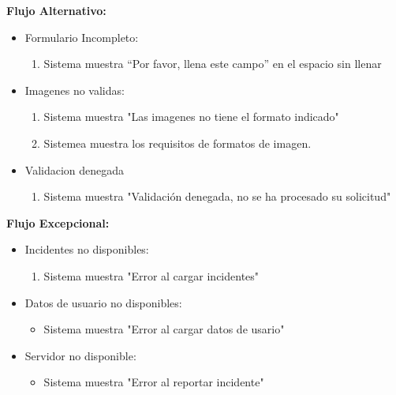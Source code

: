 \begin{multicols}{2}
\textbf{Flujo Alternativo:}
\begin{itemize}
    \item Formulario Incompleto:
    \begin{enumerate}
        \item Sistema muestra “Por favor, llena este campo” en el espacio sin llenar
    \end{enumerate}
    \item Imagenes no validas:
    \begin{enumerate}
        \item Sistema muestra "Las imagenes no tiene el formato indicado"
        \item Sistemea muestra los requisitos de formatos de imagen.
    \end{enumerate}
    \item Validacion denegada
    \begin{enumerate}
        \item Sistema muestra "Validación denegada, no se ha procesado su solicitud"
    \end{enumerate}
\end{itemize}

\textbf{Flujo Excepcional:}
\begin{itemize}
    \item Incidentes no disponibles:
    \begin{enumerate}
        \item Sistema muestra "Error al cargar incidentes"
    \end{enumerate}
    \item Datos de usuario no disponibles:
    \begin{itemize}
        \item Sistema muestra "Error al cargar datos de usario"
    \end{itemize}
    \item Servidor no disponible:
    \begin{itemize}
        \item Sistema muestra "Error al reportar incidente"
    \end{itemize}
\end{itemize}


\end{multicols}
